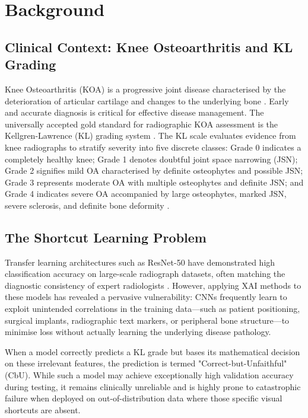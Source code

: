 \documentclass[conference]{IEEEtran}
\begin{document}
\section{Background}
\label{sec:background}

\subsection{Clinical Context: Knee Osteoarthritis and KL Grading}
Knee Osteoarthritis (KOA) is a progressive joint disease characterised by the deterioration of articular cartilage and changes to the underlying bone \cite{solak2024}. Early and accurate diagnosis is critical for effective disease management. The universally accepted gold standard for radiographic KOA assessment is the Kellgren-Lawrence (KL) grading system \cite{kellgren1957}. The KL scale evaluates evidence from knee radiographs to stratify severity into five discrete classes: Grade 0 indicates a completely healthy knee; Grade 1 denotes doubtful joint space narrowing (JSN); Grade 2 signifies mild OA characterised by definite osteophytes and possible JSN; Grade 3 represents moderate OA with multiple osteophytes and definite JSN; and Grade 4 indicates severe OA accompanied by large osteophytes, marked JSN, severe sclerosis, and definite bone deformity \cite{solak2024, kellgren1957}.

\subsection{The Shortcut Learning Problem}
Transfer learning architectures such as ResNet-50 have demonstrated high classification accuracy on large-scale radiograph datasets, often matching the diagnostic consistency of expert radiologists \cite{solak2024}. However, applying XAI methods to these models has revealed a pervasive vulnerability: CNNs frequently learn to exploit unintended correlations in the training data—such as patient positioning, surgical implants, radiographic text markers, or peripheral bone structure—to minimise loss without actually learning the underlying disease pathology.

When a model correctly predicts a KL grade but bases its mathematical decision on these irrelevant features, the prediction is termed "Correct-but-Unfaithful" (CbU). While such a model may achieve exceptionally high validation accuracy during testing, it remains clinically unreliable and is highly prone to catastrophic failure when deployed on out-of-distribution data where those specific visual shortcuts are absent.
\end{document}
